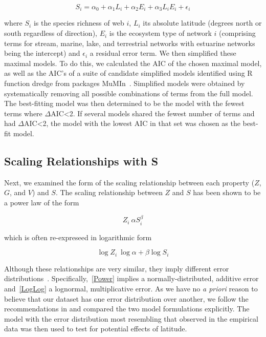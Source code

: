\documentclass[12pt]{article}
\begin{document}
\begin{equation}
\label{Latfull}
S_{i} = \alpha_{0} + \alpha_{1} L_{i} + \alpha_{2} E_{i} + \alpha_{3} L_{i} E_{i} + \epsilon_{i} 
\end{equation}

where $S_{i}$ is the species richness of web $i$, $L_{i}$ its absolute
latitude (degrees north or south  regardless of direction), $E_{i}$ is the
ecosystem type of network $i$ (comprising terms for stream, marine, lake, and terrestrial networks with estuarine
networks being the intercept) and $\epsilon_{i}$ a residual error term. 
We then simplified these maximal models. To do this, we calculated the AIC
of the chosen maximal model, as well as the AIC's of a suite of candidate simplified models identified
using R~\citep{R} function dredge from packages MuMIn~\citep{MuMIn}. Simplified models were obtained by
systematically removing all possible combinations of terms from the full model.
The best-fitting model was then determined to be the model with the fewest terms 
where $\Delta$AIC\textless2. If several models shared the fewest number of terms 
and had $\Delta$AIC\textless2, the model with the lowest AIC in that set was chosen as the best-fit
model.


\subsection*{Scaling Relationships with S}

Next, we examined the form of the scaling relationship between each 
property ($Z$, $G$, and $V$) and $S$. The scaling relationship between $Z$ and 
$S$ has been shown to be a power law \citep{Riede2010} of the form 

\begin{equation}
\label{Power}
Z_{i}~\alpha S_{i}^{\beta}
\end{equation}

which is often re-expreseed in logarithmic form 

\begin{equation}
\label{Loglog}
\log{Z_{i}} ~ \log{\alpha} + \beta\log{S_{i}}
\end{equation}


Although these relationships are very similar, they imply different error distributions~\citep{Xiao2011}.
Specifically,~\ref{Power} implies a normally-distributed, additive error and~\ref{LogLog} a lognormal,
multiplicative error. As we have no \emph{a priori} reason to believe that our dataset has one error distribution
over another, we follow the recommendations in \citet{Xiao2011} and compared the two
model formulations explicitly. The model with the error distribution most resembling that observed in the empirical
data was then used to test for potential effects of latitude.
\end{document}
